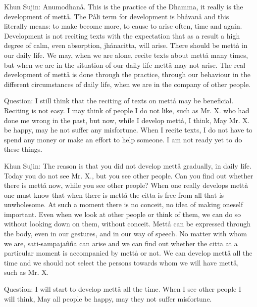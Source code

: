 \documentclass[12pt,twoside]{article}
\begin{document}
Khun Sujin: Anumodhan{\aa}. This is the practice of the Dhamma, it
really is the development of mett{\aa}. The P{\aa}li term for
development is
{\textasciigrave}{\textasciigrave}bh{\aa}van{\aa}{\textquotesingle}{\textquotesingle}
and this literally means: to make become more, to cause to arise often,
time and again. Development is not reciting texts with the expectation
that as a result a high degree of calm, even absorption,
jh{\aa}nacitta, will arise. There should be mett{\aa} in our daily
life. We may, when we are alone, recite texts about mett{\aa} many
times, but when we are in the situation of our daily life mett{\aa} may
not arise. The real development of mett{\aa} is done through the
practice, through our behaviour in the different circumstances of daily
life, when we are in the company of other people. 

Question: I still think that the reciting of texts on mett{\aa} may be
beneficial. Reciting is not easy. I may think of people I do not like,
such as Mr. X. who had done me wrong in the past, but now, while I
develop mett{\aa}, I think, {\textasciigrave}{\textasciigrave}May Mr.
X. be happy, may he not suffer any
misfortune{\textquotesingle}{\textquotesingle}. When I recite texts, I
do not have to spend any money or make an effort to help someone. I am
not ready yet to do these things. 

Khun Sujin: The reason is that you did not develop mett{\aa} gradually,
in daily life. Today you do not see Mr. X., but you see other people.
Can you find out whether there is mett{\aa} now, while you see other
people? When one really develops mett{\aa} one must know that when
there is mett{\aa} the citta is free from all that is unwholesome. At
such a moment there is no conceit, no idea of making oneself important.
Even when we look at other people or think of them, we can do so
without looking down on them, without conceit. Mett{\aa} can be
expressed through the body, even in our gestures, and in our way of
speech. No matter with whom we are, sati{}-sampaja\~n\~na can arise and
we can find out whether the citta at a particular moment is accompanied
by mett{\aa} or not. We can develop mett{\aa} all the time and we
should not select the persons towards whom we will have mett{\aa}, such
as Mr. X. 

Question: I will start to develop mett{\aa} all the time. When I see
other people I will think, {\textasciigrave}{\textasciigrave}May all
people be happy, may they not suffer
misfortune{\textquotesingle}{\textquotesingle}. 
\end{document}
